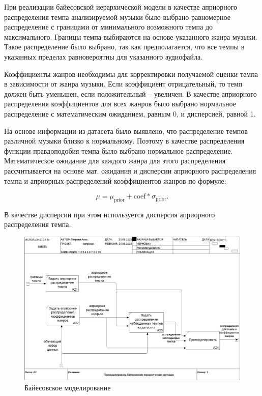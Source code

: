 При реализации байесовской иерархической модели в качестве априорного распределения темпа анализируемой музыки было выбрано равномерное распределение с границами от минимального возможного темпа до максимального. Границы темпа выбираются на основе указанного жанра музыки. Такое распределение было выбрано, так как предполагается, что все темпы в указанных пределах равновероятны для указанного аудиофайла.

Коэффициенты жанров необходимы для корректировки получаемой оценки темпа в зависимости от жанра музыки. Если коэффициент отрицательный, то темп должен быть уменьшен, если положительный -- увеличен. В качестве априорного распределения коэффициентов для всех жанров было выбрано нормальное распределение с математическим ожиданием, равным 0, и дисперсией, равной 1.

На основе информации из датасета было выявлено, что распределение темпов различной музыки близко к нормальному. Поэтому в качестве распределения функции правдоподобия темпа было выбрано нормальное распределение. Математическое ожидание для каждого жанра для этого распределения рассчитывается на основе мат. ожидания и дисперсии априорного распределения темпа и априорных распределений коэффициентов жанров по формуле:

\begin{equation}
	\mu = \mu_{\text{prior}} + \text{coef} * \sigma_{\text{prior}}.
\end{equation}

В качестве дисперсии при этом используется дисперсия априорного распределения темпа.

\begin{figure}[h]
	\centering
	\includegraphics[scale=0.25]{inc/img/tempo_idef/03_A2.png}
	\caption{Байесовское моделирование}
	\label{img:tempo_2}
\end{figure}

